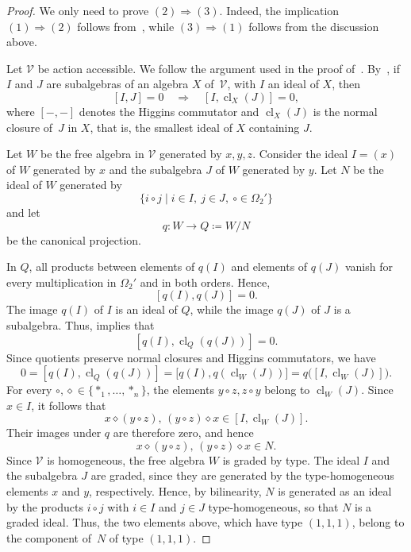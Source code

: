 \documentclass[reqno,a4paper]{amsart}
\theoremstyle{plain}
\theoremstyle{definition}
\theoremstyle{remark}
\numberwithin{equation}{section}
\newcommand{\V}{\mathcal{V}}
\begin{document}
\begin{proof}
We only need to prove $(2)\Rightarrow(3)$. Indeed, the implication $(1)\Rightarrow(2)$ follows from~\cite[Theorem~4.7]{Montoli}, while $(3)\Rightarrow(1)$ follows from the discussion above.

Let $\V$ be action accessible. We follow the argument used in the proof of~\cite[Theorem~3.4.1]{Coco_Thesis}. By~\cite[Lemma~2.9]{CigoliMantovaniMetere}, if $I$ and $J$ are subalgebras of an algebra $X$ of~$\V$, with $I$ an ideal of $X$, then
\begin{equation}\label{EqCommutatorNormalClosure}
[I,J]=0
\quad\Longrightarrow\quad
[I,\operatorname{cl}_X(J)]=0,
\end{equation}
where $[-,-]$ denotes the Higgins commutator and $\operatorname{cl}_X(J)$ is the normal closure of~$J$ in $X$, that is, the smallest ideal of $X$ containing $J$.

Let $W$ be the free algebra in $\V$ generated by $x,y,z$. Consider the ideal $I=(x)$ of $W$ generated by $x$ and the subalgebra $J$ of $W$ generated by $y$. Let $N$ be the ideal of $W$ generated by
\[
\{i\mathbin{\circ}j
\mid i\in I,\ j\in J,\ \circ\in \Omega_2'\}
\]
and let
\[
q\colon W\to Q\coloneqq W/N
\]
be the canonical projection.

In $Q$, all products between elements of $q(I)$ and elements of $q(J)$ vanish for every multiplication in $\Omega_2'$ and in both orders. Hence,
\[
[q(I),q(J)]=0.
\]
The image $q(I)$ of $I$ is an ideal of $Q$, while the image $q(J)$ of $J$ is a subalgebra. Thus, \cite[Lemma~2.9]{CigoliMantovaniMetere} implies that
\[
[q(I),\operatorname{cl}_Q(q(J))]=0.
\]
Since quotients preserve normal closures and Higgins commutators, we have
\[
0=[q(I),\operatorname{cl}_Q(q(J))]=\bigl[q(I),q(\operatorname{cl}_W(J))\bigr]=q\bigl([I,\operatorname{cl}_W(J)]\bigr).
\]
For every $\circ,\diamond\in\{\ast_1,\ldots,\ast_n\}$, the elements $y\mathbin{\circ}z,z\mathbin{\circ}y$ belong to $\operatorname{cl}_W(J)$. Since $x\in I$, it follows that
\[
x\mathbin{\diamond}(y\mathbin{\circ}z), \,(y\mathbin{\circ}z)\mathbin{\diamond}x
\in[I,\operatorname{cl}_W(J)].
\]
Their images under $q$ are therefore zero, and hence
\[
x\mathbin{\diamond}(y\mathbin{\circ}z),\,(y\mathbin{\circ}z)\mathbin{\diamond}x
\in N.
\]
Since $\V$ is homogeneous, the free algebra $W$ is graded by type. The ideal $I$ and the subalgebra $J$ are graded, since they are generated by the type-homogeneous elements $x$ and $y$, respectively. Hence, by bilinearity, $N$ is generated as an ideal by the products $i\mathbin{\circ}j$ with $i\in I$ and $j\in J$ type-homogeneous, so that $N$ is a graded ideal. Thus, the two elements above, which have type $(1,1,1)$, belong to the component of~$N$ of type $(1,1,1)$.


\end{proof}
\end{document}

